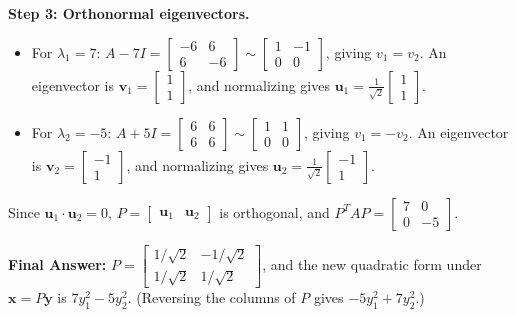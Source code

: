 \documentclass[11pt, letterpaper]{article}
\theoremstyle{definition}
\theoremstyle{remark}
\begin{document}
\textbf{Step 3: Orthonormal eigenvectors.}
\begin{itemize}
    \item For $\lambda_1 = 7$: $A - 7I = \begin{bmatrix} -6 & 6 \\ 6 & -6 \end{bmatrix} \sim \begin{bmatrix} 1 & -1 \\ 0 & 0 \end{bmatrix}$, giving $v_1 = v_2$. An eigenvector is $\mathbf{v}_1 = \begin{bmatrix} 1 \\ 1 \end{bmatrix}$, and normalizing gives $\mathbf{u}_1 = \frac{1}{\sqrt{2}}\begin{bmatrix} 1 \\ 1 \end{bmatrix}$.
    \item For $\lambda_2 = -5$: $A + 5I = \begin{bmatrix} 6 & 6 \\ 6 & 6 \end{bmatrix} \sim \begin{bmatrix} 1 & 1 \\ 0 & 0 \end{bmatrix}$, giving $v_1 = -v_2$. An eigenvector is $\mathbf{v}_2 = \begin{bmatrix} -1 \\ 1 \end{bmatrix}$, and normalizing gives $\mathbf{u}_2 = \frac{1}{\sqrt{2}}\begin{bmatrix} -1 \\ 1 \end{bmatrix}$.
\end{itemize}
Since $\mathbf{u}_1 \cdot \mathbf{u}_2 = 0$, $P = \begin{bmatrix} \mathbf{u}_1 & \mathbf{u}_2 \end{bmatrix}$ is orthogonal, and $P^T A P = \begin{bmatrix} 7 & 0 \\ 0 & -5 \end{bmatrix}$.

\textbf{Final Answer:} $P = \begin{bmatrix} 1/\sqrt{2} & -1/\sqrt{2} \\ 1/\sqrt{2} & 1/\sqrt{2} \end{bmatrix}$, and the new quadratic form under $\mathbf{x} = P\mathbf{y}$ is $7y_1^2 - 5y_2^2$. (Reversing the columns of $P$ gives $-5y_1^2 + 7y_2^2$.)
\end{document}
